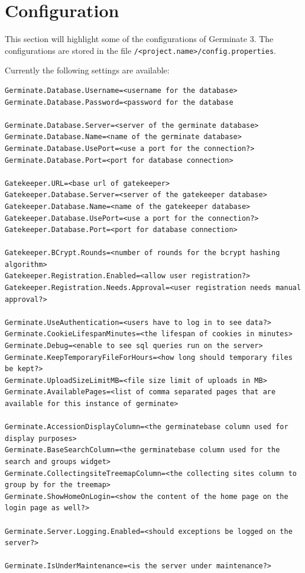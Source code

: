\section{Configuration}
\label{sec:config}
This section will highlight some of the configurations of Germinate 3. The configurations are stored in the file \texttt{\instanceStuff/<project.name>/config.properties}.

Currently the following settings are available:

\begin{lstlisting}[style=Properties]
Germinate.Database.Username=<username for the database>
Germinate.Database.Password=<password for the database

Germinate.Database.Server=<server of the germinate database>
Germinate.Database.Name=<name of the germinate database>
Germinate.Database.UsePort=<use a port for the connection?>
Germinate.Database.Port=<port for database connection>

Gatekeeper.URL=<base url of gatekeeper>
Gatekeeper.Database.Server=<server of the gatekeeper database>
Gatekeeper.Database.Name=<name of the gatekeeper database>
Gatekeeper.Database.UsePort=<use a port for the connection?>
Gatekeeper.Database.Port=<port for database connection>

Gatekeeper.BCrypt.Rounds=<number of rounds for the bcrypt hashing algorithm>
Gatekeeper.Registration.Enabled=<allow user registration?>
Gatekeeper.Registration.Needs.Approval=<user registration needs manual approval?>

Germinate.UseAuthentication=<users have to log in to see data?>
Germinate.CookieLifespanMinutes=<the lifespan of cookies in minutes>
Germinate.Debug=<enable to see sql queries run on the server>
Germinate.KeepTemporaryFileForHours=<how long should temporary files be kept?>
Germinate.UploadSizeLimitMB=<file size limit of uploads in MB>
Germinate.AvailablePages=<list of comma separated pages that are available for this instance of germinate>

Germinate.AccessionDisplayColumn=<the germinatebase column used for display purposes>
Germinate.BaseSearchColumn=<the germinatebase column used for the search and groups widget>
Germinate.CollectingsiteTreemapColumn=<the collecting sites column to group by for the treemap>
Germinate.ShowHomeOnLogin=<show the content of the home page on the login page as well?>

Germinate.Server.Logging.Enabled=<should exceptions be logged on the server?>

Germinate.IsUnderMaintenance=<is the server under maintenance?>


\end{lstlisting}
